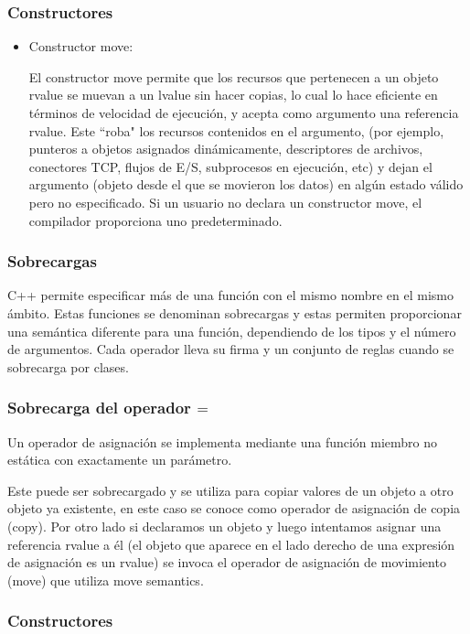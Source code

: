 \documentclass{beamer}
\begin{document}
	\begin{frame}
		\frametitle{Constructores}
		\begin{itemize}
			\item Constructor move:
			
			El constructor move permite que los recursos que pertenecen a un objeto rvalue se muevan a un lvalue sin hacer copias, lo cual lo hace eficiente en términos de velocidad de ejecución, y acepta como argumento una referencia rvalue. Este ``roba" los recursos contenidos en el argumento, (por ejemplo, punteros a objetos asignados dinámicamente, descriptores de archivos, conectores TCP, flujos de E/S, subprocesos en ejecución, etc) y dejan el argumento (objeto desde el que se movieron los datos) en algún estado válido pero no especificado. Si un usuario no declara un constructor move, el compilador proporciona uno predeterminado.	
		\end{itemize}
	\end{frame}

	\begin{frame}
		\frametitle{Sobrecargas}
		C++ permite especificar más de una función con el mismo nombre en el mismo ámbito. Estas funciones se denominan sobrecargas y estas permiten proporcionar una semántica diferente para una función, dependiendo de los tipos y el número de argumentos. Cada operador lleva su firma y un conjunto de reglas cuando se sobrecarga por clases.
	\end{frame}
	
	\begin{frame}
		\frametitle{Sobrecarga del operador $ \textbf{=} $}
		Un operador de asignación se implementa mediante una función miembro no estática con exactamente un parámetro.
		
		Este puede ser sobrecargado y se utiliza para copiar valores de un objeto a otro objeto ya existente, en este caso se conoce como operador de asignaci\'on de copia (copy). Por otro lado si declaramos un objeto y luego intentamos asignar una referencia rvalue a él (el objeto que aparece en el lado derecho de una expresión de asignación es un rvalue) se invoca el operador de asignación de movimiento (move) que utiliza move semantics. 
	\end{frame}
	
	\begin{frame}
		\frametitle{Constructores}
		
	\end{frame}
	
\end{document}
